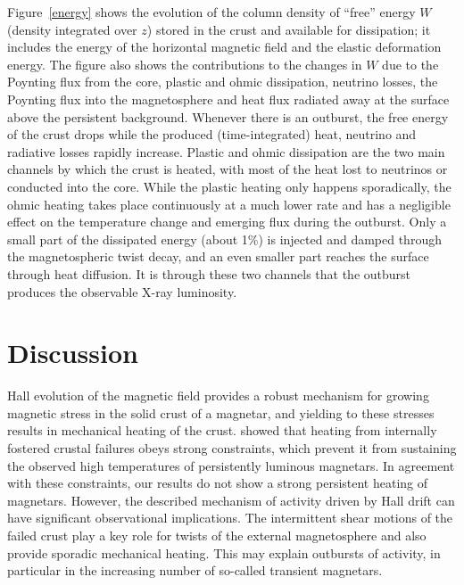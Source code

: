 Figure~\ref{energy} shows the evolution of the column density of ``free'' energy $W$ (density integrated over $z$) stored in the crust and available for dissipation; it includes the energy of the horizontal magnetic field and the elastic deformation energy. 
The figure also shows the contributions to the changes in $W$ due to the Poynting flux from the core, plastic and ohmic dissipation, neutrino losses, the Poynting flux into the magnetosphere and heat flux radiated away at the surface above the persistent background.
Whenever there is an outburst, the free energy of the crust drops while the produced (time-integrated) heat, neutrino and radiative losses rapidly increase. 
Plastic and ohmic dissipation are the two main channels by which the crust is heated, with most of the heat lost to neutrinos or conducted into the core. While the plastic heating only happens sporadically, the ohmic heating takes place continuously at a much lower  rate and has a negligible effect on the temperature change and emerging flux during the outburst. 
Only a small part of the dissipated energy (about 1\%) is injected and damped through the magnetospheric twist decay, and an even smaller part reaches the surface through heat diffusion.
It is through these two channels that the outburst produces the observable X-ray luminosity.

\section{Discussion}\label{discussion}


Hall evolution of the magnetic field provides a robust mechanism for growing 
magnetic stress in the solid crust of a magnetar, and yielding to these stresses results in mechanical heating of the crust. 
\citet{2016ApJ...833..261B} showed that heating from internally fostered crustal failures obeys strong constraints, which prevent it from sustaining the observed high temperatures of persistently luminous magnetars. 
In agreement with these constraints, our results do not show a strong persistent heating of magnetars. 
However, the described mechanism of activity driven by Hall drift can have significant observational implications. 
The intermittent shear motions of the failed crust play a key role for twists of the external magnetosphere and also provide sporadic mechanical heating. 
This may explain outbursts of activity, in particular in the increasing number of so-called transient magnetars.

